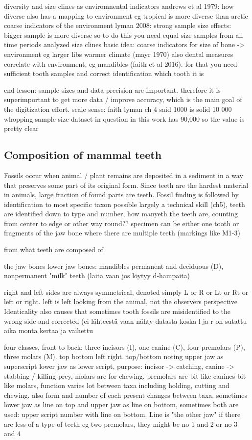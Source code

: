 \documentclass{article}
\begin{document}
diversity and size clines as enviromnental indicators
andrews et al 1979: how diverse also has a mapping to environment eg tropical is more diverse than arctic 
coarse indicators of the environment
lyman 2008: strong sample size effects: bigger sample is more diverse
so to do this you need equal size samples from all time periods analyzed
size clines basic idea: coarse indicators for size of bone -> environment eg larger libs warmer climate (mayr 1970)
also dental measures correlate with environment, eg mandibles (faith et al 2016). for that you need sufficient 
tooth samples and correct identification which tooth it is

end lesson: sample sizes and data precision are important. therefore it is superimportant 
to get more data / improve accuracy, which is the main goal of the digitization effort.
scale sense: faith lyman ch 4 said 1000 is solid 10 000 whopping sample size
dataset in question in this work has 90,000 so the value is pretty clear

\subsection{Composition of mammal teeth}

Fossils occur when animal / plant remains are deposited in a sediment in a way that preserves 
some part of its original form. Since teeth are the hardest material in animals, large fraction
of found parts are teeth. Fossil finding is followed by identification to most specific taxon possible
largely a technical skill (ch5), teeth are identified down to type and number, how manyeth the teeth are,
counting from center to edge or other way round??
specimen can be either one tooth or fragments of the jaw bone where there are multiple teeth (markings like M1-3)

from \cite{Hillson_2005} what teeth are composed of

 the jaw bones
lower jaw bones: mandibles
 permanent and deciduous (D), nonpermanent "milk" teeth (laita vaan jos löytyy d-hampaita)

right and left sides are always symmetrical, denoted simply L or R or Lt or Rt or left or right. left is left looking from the animal, not the observers perspective
Identicality also causes that sometimes tooth fossils are misidentified to the wrong side and corrected (ei lähteestä vaan nähty datasta koska l ja r on sutattu aika monta kertaa ja vaihettu

four classes, front to back: three incisors (I), one canine (C), four premolars (P), three molars (M). top bottom left right. top/bottom noting upper jaw as superscript lower jaw as lower script, 
 purpose: incisor -> catching, canine -> stabbing / killing prey, molars are for chewing. premolars are bit like canines bit like molars, function varies lot
 between taxa including holding, cutting and chewing. also form and number of each present changes between taxa.
sometimes lower jaw as line on top and upper jaw as line on bottom, sometimes both are used: upper script number with line on bottom. Line is "the other jaw"
if there are less of a type of teeth eg two premolars, they might be no 1 and 2 or no 3 and 4
\end{document}
